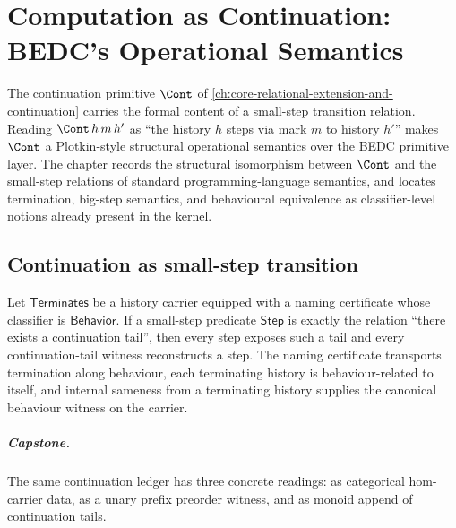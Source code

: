 \chapter{Computation as Continuation: BEDC's Operational Semantics}
\label{ch:capstones-computation-as-continuation}

The continuation primitive $\Cont$ of \autoref{ch:core-relational-extension-and-continuation} carries the formal content of a small-step transition relation. Reading $\Cont\,h\,m\,h'$ as ``the history $h$ steps via mark $m$ to history $h'$'' makes $\Cont$ a Plotkin-style structural operational semantics over the BEDC primitive layer. The chapter records the structural isomorphism between $\Cont$ and the small-step relations of standard programming-language semantics, and locates termination, big-step semantics, and behavioural equivalence as classifier-level notions already present in the kernel.

\section{Continuation as small-step transition}
\label{sec:computation-as-continuation-small-step}

\begin{theorem}
\label{thm:computation-as-continuation-correspondence}
Let $\mathsf{Terminates}$ be a history carrier equipped with a naming certificate whose classifier is $\mathsf{Behavior}$. If a small-step predicate $\mathsf{Step}$ is exactly the relation ``there exists a continuation tail'', then every step exposes such a tail and every continuation-tail witness reconstructs a step. The naming certificate transports termination along behaviour, each terminating history is behaviour-related to itself, and internal sameness from a terminating history supplies the canonical behaviour witness on the carrier.
\end{theorem}

\paragraph{Capstone.}
The same continuation ledger has three concrete readings: as categorical
hom-carrier data, as a unary prefix preorder witness, and as monoid append of
continuation tails.

